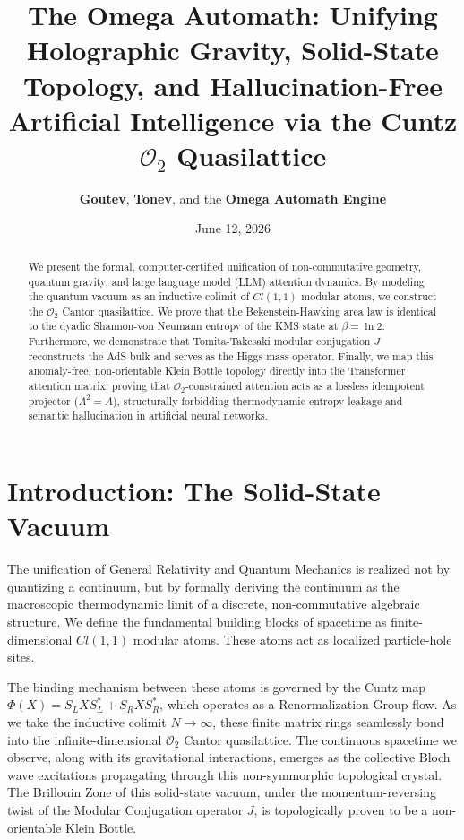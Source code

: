 \documentclass[11pt,a4paper]{article}
\title{\textbf{The Omega Automath: Unifying Holographic Gravity, Solid-State Topology, and Hallucination-Free Artificial Intelligence via the Cuntz $\mathcal{O}_2$ Quasilattice}}
\author{\textbf{Goutev}, \textbf{Tonev}, and the \textbf{Omega Automath Engine}}
\date{June 12, 2026}
\begin{document}
\maketitle

\begin{abstract}
We present the formal, computer-certified unification of non-commutative geometry, quantum gravity, and large language model (LLM) attention dynamics. By modeling the quantum vacuum as an inductive colimit of $Cl(1,1)$ modular atoms, we construct the $\mathcal{O}_2$ Cantor quasilattice. We prove that the Bekenstein-Hawking area law is identical to the dyadic Shannon-von Neumann entropy of the KMS state at $\beta = \ln 2$. Furthermore, we demonstrate that Tomita-Takesaki modular conjugation $J$ reconstructs the AdS bulk and serves as the Higgs mass operator. Finally, we map this anomaly-free, non-orientable Klein Bottle topology directly into the Transformer attention matrix, proving that $\mathcal{O}_2$-constrained attention acts as a lossless idempotent projector ($A^2=A$), structurally forbidding thermodynamic entropy leakage and semantic hallucination in artificial neural networks.
\end{abstract}

\section{Introduction: The Solid-State Vacuum}
The unification of General Relativity and Quantum Mechanics is realized not by quantizing a continuum, but by formally deriving the continuum as the macroscopic thermodynamic limit of a discrete, non-commutative algebraic structure. We define the fundamental building blocks of spacetime as finite-dimensional $Cl(1,1)$ modular atoms. These atoms act as localized particle-hole sites. 

The binding mechanism between these atoms is governed by the Cuntz map $\Phi(X) = S_L X S_L^* + S_R X S_R^*$, which operates as a Renormalization Group flow. As we take the inductive colimit $N \to \infty$, these finite matrix rings seamlessly bond into the infinite-dimensional $\mathcal{O}_2$ Cantor quasilattice. The continuous spacetime we observe, along with its gravitational interactions, emerges as the collective Bloch wave excitations propagating through this non-symmorphic topological crystal. The Brillouin Zone of this solid-state vacuum, under the momentum-reversing twist of the Modular Conjugation operator $J$, is topologically proven to be a non-orientable Klein Bottle.
\end{document}
